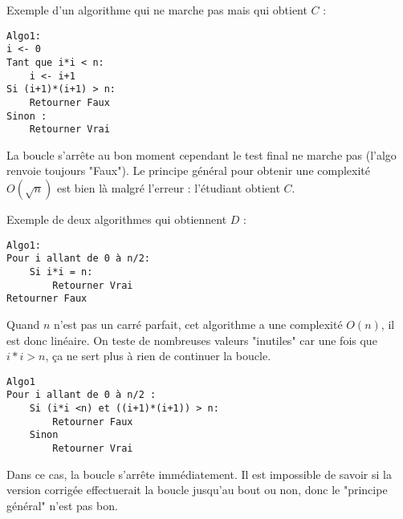 \begin{exercice}[Partiel 2017-18]
Exemple d'un algorithme qui ne marche pas mais qui obtient $C$ :

\begin{lstlisting}
Algo1:
i <- 0
Tant que i*i < n:
    i <- i+1
Si (i+1)*(i+1) > n:
    Retourner Faux
Sinon :
    Retourner Vrai
\end{lstlisting}

La boucle s'arrête au bon moment cependant le test final ne marche pas (l'algo renvoie toujours "Faux"). Le principe général pour obtenir une complexité $O\left(\sqrt{n}\right)$ est bien là malgré l'erreur : l'étudiant obtient $C$.

Exemple de deux algorithmes qui obtiennent $D$ :

\begin{lstlisting}
Algo1:
Pour i allant de 0 à n/2:
    Si i*i = n:
        Retourner Vrai
Retourner Faux
\end{lstlisting}

Quand $n$ n'est pas un carré parfait, cet algorithme a une complexité $O(n)$, il est donc linéaire. On teste de nombreuses valeurs "inutiles" car une fois que $i*i > n$, ça ne sert plus à rien de continuer la boucle.

\begin{lstlisting}
Algo1
Pour i allant de 0 à n/2 :
    Si (i*i <n) et ((i+1)*(i+1)) > n:
        Retourner Faux
    Sinon 
        Retourner Vrai
\end{lstlisting} 

Dans ce cas, la boucle s'arrête immédiatement. Il est impossible de savoir si la version corrigée effectuerait la boucle jusqu'au bout ou non, donc le "principe général" n'est pas bon. 


\end{exercice}
